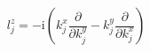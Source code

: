 \begin{equation}
l^z_j = -{\mathrm i} \left(k^x_j\frac{\partial}{\partial k^y_j}
-k^y_j\frac{\partial}{\partial k^x_j}\right)
\end{equation}

